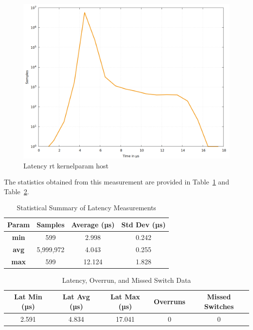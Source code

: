 \documentclass[MMR,Master,english]{twbook}
\begin{document}
\begin{figure}[H]
	\centering
	\includegraphics[width=0.7\columnwidth]{masterthesis-documentation/docs/sigmatek/xenomai/5rt_kernelparam_host/gnuplot_max_latency_rt_kernelparam_host.png}
	\caption[Latency rt kernelparam host]{Latency rt kernelparam host}
	\label{fig:max_latency_rt_kernelparam_host}
\end{figure}


\noindent The statistics obtained from this measurement are provided in Table~\ref{tab:latency_stats_virt_host} and Table~\ref{tab:latency_overrun_msw_new_virt_host}. 


\begin{table}[H]
	\centering
	\begin{tabular}{|c|c|c|c|}
	\hline
	\textbf{Param} & \textbf{Samples} & \textbf{Average (µs)} & \textbf{Std Dev (µs)} \\ \hline
	\textbf{min} & 599 & 2.998 & 0.242 \\ \hline
	\textbf{avg} & 5,999,972 & 4.043 & 0.255 \\ \hline
	\textbf{max} & 599 & 12.124 & 1.828 \\ \hline
	\end{tabular}
	\caption{Statistical Summary of Latency Measurements}
	\label{tab:latency_stats_virt_host}
	\end{table}
	
	\begin{table}[H]
	\centering
	\begin{tabular}{|c|c|c|c|c|}
	\hline
	\textbf{Lat Min (µs)} & \textbf{Lat Avg (µs)} & \textbf{Lat Max (µs)} & \textbf{Overruns} & \textbf{Missed Switches} \\ \hline
	2.591 & 4.834 & 17.041 & 0 & 0 \\ \hline
	\end{tabular}
	\caption{Latency, Overrun, and Missed Switch Data}
	\label{tab:latency_overrun_msw_new_virt_host}
	\end{table}
	
\end{document}
